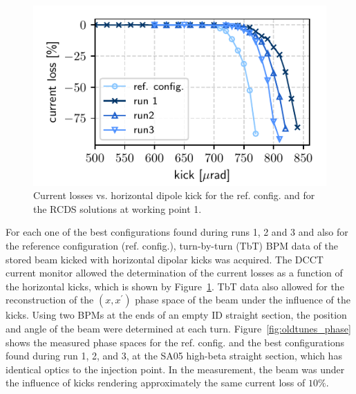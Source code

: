 \documentclass[a4paper,
               keeplastbox,   %
               ]{jacow}
\begin{document}
\begin{figure}[!h]
   \includegraphics[width=\columnwidth]{old_tunes_kick_resilience.pdf}
   \caption{Current losses vs. horizontal dipole kick for the ref. config. and for the RCDS solutions at working point 1.}
   \label{fig:loss_kicks}
\end{figure}
For each one of the best configurations found during runs 1, 2 and 3 and also for the reference configuration (ref. config.), turn-by-turn (TbT) BPM data of the stored beam kicked with horizontal dipolar kicks was acquired. The DCCT current monitor allowed the determination of the current losses as a function of the horizontal kicks, which is shown by Figure~\ref{fig:loss_kicks}. 
TbT data also allowed for the reconstruction of the $(x,x^\prime)$ phase space of the beam under the influence of the kicks. Using two BPMs at the ends of an empty ID straight section, the position and angle of the beam were determined at each turn. 
Figure~\ref{fig:oldtunes_phase} shows the measured phase spaces for the ref. config. and the best configurations found during run 1, 2, and 3, at the SA05 high-beta straight section, which has identical optics to the injection point. In the measurement, the beam was under the influence of kicks rendering approximately the same current loss of $10\%$.
\end{document}

